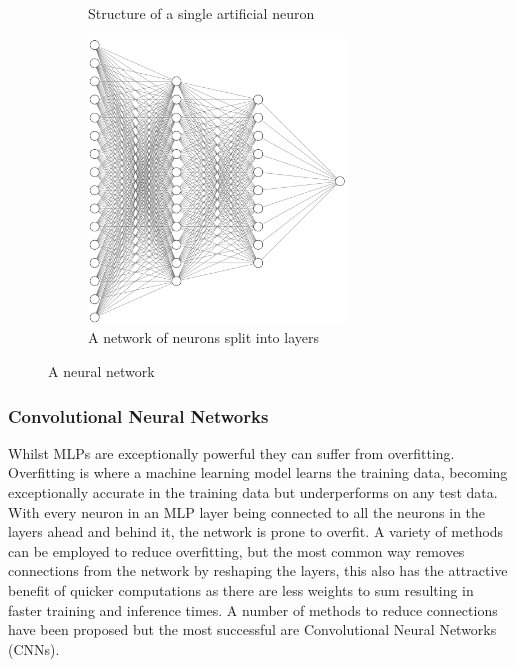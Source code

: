 \begin{figure}[h]
\begin{subfigure}[t]{0.45\textwidth}
        \caption{Structure of a single artificial neuron}
        \label{fig:neuron}
    \end{subfigure}
    \begin{subfigure}[t]{0.45\textwidth}
        \centering
        \includegraphics[width=0.75\textwidth]{dissertation//figures/generic-neural-diagram.png}
        \caption{A network of neurons split into layers}
        \label{fig:full-neural-network}
    \end{subfigure}
    \caption{A neural network}
    \label{fig:neural-network}
\end{figure}

\subsubsection{Convolutional Neural Networks}

Whilst MLPs are exceptionally powerful they can suffer from overfitting. Overfitting is where a machine learning model learns the training data, becoming exceptionally accurate in the training data but underperforms on any test data. With every neuron in an MLP layer being connected to all the neurons in the layers ahead and behind it, the network is prone to overfit\cite{o2015introduction}. A variety of methods can be employed to reduce overfitting, but the most common way removes connections from the network by reshaping the layers, this also has the attractive benefit of quicker computations as there are less weights to sum resulting in faster training and inference times. A number of methods to reduce connections have been proposed but the most successful are Convolutional Neural Networks (CNNs).

